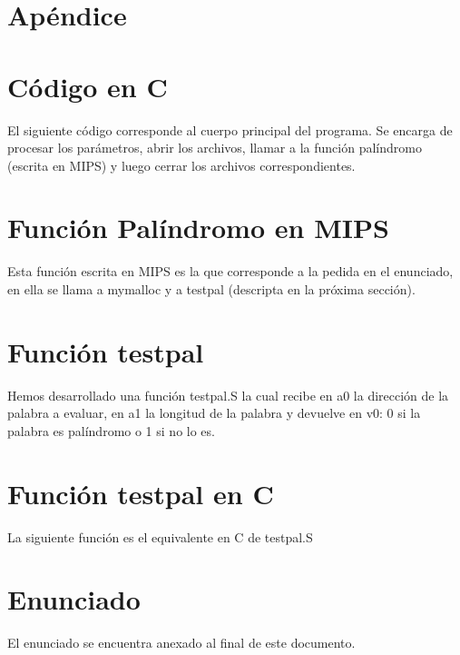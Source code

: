 \documentclass[11pt,a4paper]{article}
\begin{document}
\section*{Apéndice}

\section{Código en C}
El siguiente código corresponde al cuerpo principal del programa. Se encarga de procesar los parámetros, abrir los archivos, llamar a la función palíndromo (escrita en MIPS) y luego cerrar los archivos correspondientes.



\section{Función Palíndromo en MIPS}
Esta función escrita en MIPS es la que corresponde a la pedida en el enunciado, en ella se llama a mymalloc y a testpal (descripta en la próxima sección).



\section{Función testpal}
Hemos desarrollado una función testpal.S la cual recibe en a0 la dirección de la palabra a evaluar, en a1 la longitud de la palabra y devuelve en v0: 0 si la palabra es palíndromo o 1 si no lo es.



\section{Función testpal en C}
La siguiente función es el equivalente en C de testpal.S



\section{Enunciado}
El enunciado se encuentra anexado al final de este documento.
\end{document}
